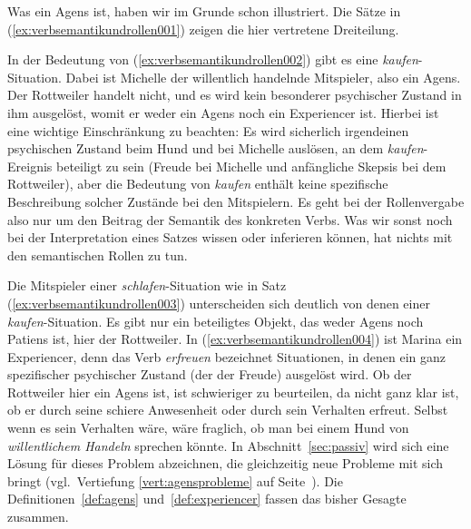 Was ein Agens ist, haben wir im Grunde schon illustriert.
Die Sätze in (\ref{ex:verbsemantikundrollen001}) zeigen die hier vertretene Dreiteilung.

\begin{exe}
  \ex\label{ex:verbsemantikundrollen001}
  \begin{xlist}
  \end{xlist}
\end{exe}

In der Bedeutung von (\ref{ex:verbsemantikundrollen002}) gibt es eine \textit{kaufen}-Situation.
Dabei ist Michelle der willentlich handelnde Mitspieler, also ein Agens.
Der Rottweiler handelt nicht, und es wird kein besonderer psychischer Zustand in ihm ausgelöst, womit er weder ein Agens noch ein Experiencer ist.
Hierbei ist eine wichtige Einschränkung zu beachten: Es wird sicherlich irgendeinen psychischen Zustand beim Hund und bei Michelle auslösen, an dem \textit{kaufen}-Ereignis beteiligt zu sein (\zB Freude bei Michelle und anfängliche Skepsis bei dem Rottweiler), aber die Bedeutung von \textit{kaufen} enthält keine spezifische Beschreibung solcher Zustände bei den Mitspielern.
Es geht bei der Rollenvergabe also nur um den Beitrag der Semantik des konkreten Verbs.
Was wir sonst noch bei der Interpretation eines Satzes wissen oder inferieren können, hat nichts mit den semantischen Rollen zu tun.

Die Mitspieler einer \textit{schlafen}-Situation wie in Satz (\ref{ex:verbsemantikundrollen003}) unterscheiden sich deutlich von denen einer \textit{kaufen}-Situation.
Es gibt nur ein beteiligtes Objekt, das weder Agens noch Patiens ist, hier der Rottweiler.
In (\ref{ex:verbsemantikundrollen004}) ist Marina ein Experiencer, denn das Verb \textit{erfreuen} bezeichnet Situationen, in denen ein ganz spezifischer psychischer Zustand (der der Freude) ausgelöst wird.
Ob der Rottweiler hier ein Agens ist, ist schwieriger zu beurteilen, da nicht ganz klar ist, ob er durch seine schiere Anwesenheit oder durch sein Verhalten erfreut.
Selbst wenn es sein Verhalten wäre, wäre fraglich, ob man bei einem Hund von \textit{willentlichem Handeln} sprechen könnte.
In Abschnitt~\ref{sec:passiv} wird sich eine Lösung für dieses Problem abzeichnen, die gleichzeitig neue Probleme mit sich bringt (vgl.\ Vertiefung \ref{vert:agensprobleme} auf Seite~\pageref{vert:agensprobleme}).
Die Definitionen~\ref{def:agens} und~\ref{def:experiencer} fassen das bisher Gesagte zusammen.


